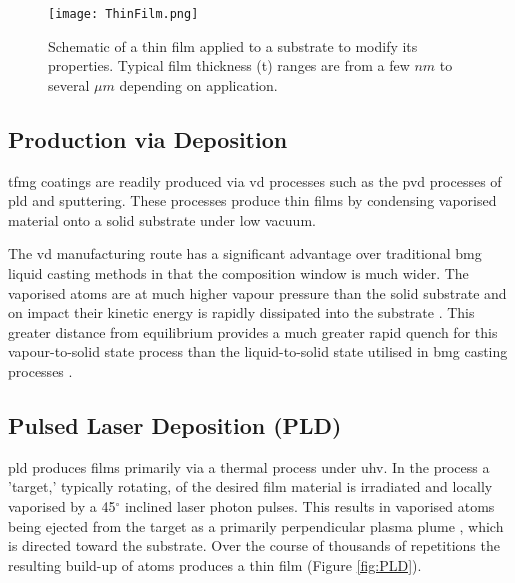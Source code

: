 \documentclass[a4paper,12pt,oneside]{report}%
\begin{document}
\begin{figure}[htbp]
	\centering
	\texttt{[image: ThinFilm.png]}
	\caption[Schematic of a thin film applied to a substrate to modify its properties. Typical film thickness (t) ranges are from a few $nm$ to several $\mu m$ depending on application.]{Schematic of a thin film applied to a substrate to modify its properties. Typical film thickness (t) ranges are from a few $nm$ to several $\mu m$ depending on application.}
	\label{fig:ThinFilm}
\end{figure}

\subsection{Production via Deposition}
\Gls{tfmg} coatings are readily produced via \gls{vd} processes such as the \gls{pvd} processes of \gls{pld} and sputtering. These processes produce thin films by condensing vaporised material onto a solid substrate under low vacuum. 

The \gls{vd} manufacturing route has a significant advantage over traditional \gls{bmg} liquid casting methods in that the composition window is much wider. The vaporised atoms are at much higher vapour pressure than the solid substrate and on impact their kinetic energy is rapidly dissipated into the substrate \cite{Ishii2014}. This greater distance from equilibrium provides a much greater rapid quench for this vapour-to-solid state process than the liquid-to-solid state utilised in \gls{bmg} casting processes \cite{Chu2012b}. 

\subsection{Pulsed Laser Deposition (PLD)}
\Acrfull{pld} produces films primarily via a thermal process under \gls{uhv}. In the process a 'target,' typically rotating, of the desired film material is irradiated and locally vaporised by a 45$^{\circ}$ inclined laser photon pulses. This results in vaporised atoms being ejected from the target as a primarily perpendicular plasma plume , which is directed toward the substrate. Over the course of thousands of repetitions the resulting build-up of atoms produces a thin film (Figure \ref{fig:PLD}). 
\end{document}

